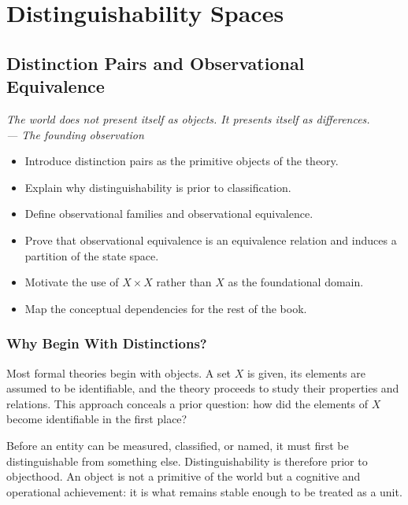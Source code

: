 \documentclass[12pt,twoside,openright]{book}
\newenvironment{epigraph}[2]{%
  \vspace{1em}\begin{flushright}
  \begin{minipage}{0.72\textwidth}
  \itshape\small #1\\[0.4em]
  \upshape\footnotesize\sffamily\color{DistGray}--- #2
  \end{minipage}\end{flushright}\vspace{1.5em}}{}
\newenvironment{objectives}{%
  \begin{tcolorbox}[colback=DistBlue!5,colframe=DistBlue,
    title={\faCheckCircle\enspace Chapter Objectives},
    fonttitle=\sffamily\bfseries\color{white},
    attach boxed title to top left={yshift=-2mm,xshift=4mm},
    boxed title style={colback=DistBlue},breakable]
  \begin{itemize}[leftmargin=*,nosep]}{%
  \end{itemize}\end{tcolorbox}\vspace{1em}}
\begin{document}
\mainmatter

\part{Distinguishability Spaces}



\chapter{Distinction Pairs and Observational Equivalence}
\label{ch:distinction-pairs}

\begin{epigraph}{The world does not present itself as objects.
  It presents itself as differences.}{The founding observation}
\end{epigraph}

\begin{objectives}
\item Introduce distinction pairs as the primitive objects of
  the theory.
\item Explain why distinguishability is prior to classification.
\item Define observational families and observational equivalence.
\item Prove that observational equivalence is an equivalence
  relation and induces a partition of the state space.
\item Motivate the use of $X\times X$ rather than $X$ as the
  foundational domain.
\item Map the conceptual dependencies for the rest of the book.
\end{objectives}

\section{Why Begin With Distinctions?}

Most formal theories begin with objects. A set $X$ is given,
its elements are assumed to be identifiable, and the theory
proceeds to study their properties and relations. This approach
conceals a prior question: how did the elements of $X$ become
identifiable in the first place?

Before an entity can be measured, classified, or named, it must
first be distinguishable from something else. Distinguishability
is therefore prior to objecthood. An object is not a primitive
of the world but a cognitive and operational achievement: it is
what remains stable enough to be treated as a unit.
\end{document}
